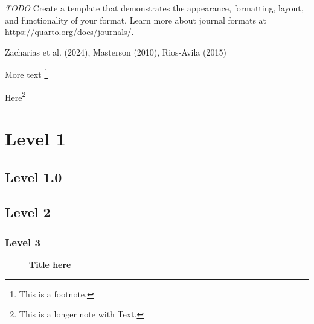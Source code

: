 \documentclass[
  12pt,
]{article}
\begin{document}
\emph{TODO} Create a template that demonstrates the appearance,
formatting, layout, and functionality of your format. Learn more about
journal formats at \url{https://quarto.org/docs/journals/}.

Zacharias et al. (2024), Masterson (2010), Rios‐Avila (2015)

\lipsum[1-2]

More text \footnote{This is a footnote.}

\lipsum[1] Here\footnote{This is a longer note with Text.\lipsum[1]}

\section{Level 1}\label{level-1}

\subsection{Level 1.0}\label{level-1.0}

\lipsum[1-2]

\subsection{Level 2}\label{level-2}

\lipsum[1-2]

\subsubsection{Level 3}\label{level-3}

\begin{table}[H]

\caption{\label{tbl-one}\textbf{Title here}}


\end{table}%

\lipsum[1-2]

\begin{figure}

\caption{\label{fig-one}\textbf{Title here}}


\end{figure}%
\end{document}

